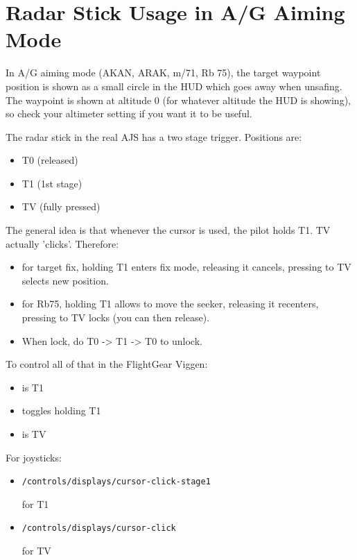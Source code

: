 \section{Radar Stick Usage in A/G Aiming Mode}
In A/G aiming mode (AKAN, ARAK, m/71, Rb 75), the target waypoint position is shown as a small circle in the HUD which goes away when unsafing. The waypoint is shown at altitude 0 (for whatever altitude the HUD is showing), so check your altimeter setting if you want it to be useful.

The radar stick in the real AJS has a two stage trigger. Positions are:
\begin{itemize}[nosep]
  \item T0 (released)
  \item T1 (1st stage)
  \item TV (fully pressed)
\end{itemize}

The general idea is that whenever the cursor is used, the pilot holds T1. TV actually 'clicks'. Therefore:
\begin{itemize}[nosep]
  \item for target fix, holding T1 enters fix mode, releasing it cancels, pressing to TV selects new position.
  \item for Rb75, holding T1 allows to move the seeker, releasing it recenters, pressing to TV locks (you can then release).
  \item When lock, do T0 -> T1 -> T0 to unlock.
\end{itemize}

To control all of that in the FlightGear Viggen:
\begin{itemize}[nosep]
  \item {} is T1
  \item {} toggles holding T1
  \item {} is TV
\end{itemize}

For joysticks:
\begin{itemize}[nosep]
  \item \begin{alltt}/controls/displays/cursor-click-stage1\end{alltt} for T1
  \item \begin{alltt}/controls/displays/cursor-click\end{alltt} for TV
\end{itemize}

